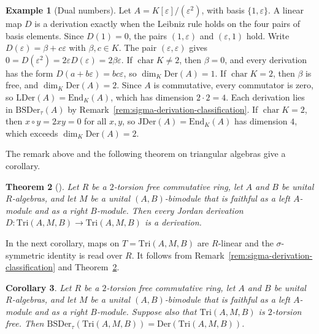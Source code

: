 \documentclass[]{interact}
\theoremstyle{plain}
\newtheorem{theorem}{Theorem}[section]
\newtheorem{corollary}[theorem]{Corollary}
\theoremstyle{definition}
\newtheorem{example}[theorem]{Example}
\theoremstyle{remark}
\newcommand{\Der}{\mathrm{Der}}
\newcommand{\JDer}{\mathrm{JDer}}
\newcommand{\BSDer}{\mathrm{BSDer}}
\newcommand{\LDer}{\mathrm{LDer}}
\begin{document}
\begin{example}[Dual numbers]\label{ex:dual-numbers}
Let $A = K[\varepsilon]/(\varepsilon^2)$, with basis $\{1, \varepsilon\}$.
A linear map $D$ is a derivation exactly when the Leibniz rule holds on the four pairs of basis elements.
Since $D(1) = 0$, the pairs $(1,\varepsilon)$ and $(\varepsilon,1)$ hold.
Write $D(\varepsilon) = \beta + c\varepsilon$ with $\beta, c \in K$.
The pair $(\varepsilon,\varepsilon)$ gives $0 = D(\varepsilon^2) = 2\varepsilon D(\varepsilon) = 2\beta\varepsilon$.
If $\operatorname{char} K \neq 2$, then $\beta = 0$, and every derivation has the form $D(a + b\varepsilon) = bc\varepsilon$, so $\dim_K \Der(A) = 1$.
If $\operatorname{char} K = 2$, then $\beta$ is free, and $\dim_K \Der(A) = 2$.
Since $A$ is commutative, every commutator is zero, so $\LDer(A) = \mathrm{End}_K(A)$, which has dimension $2 \cdot 2 = 4$.
Each derivation lies in $\BSDer_\tau(A)$ by Remark~\ref{rem:sigma-derivation-classification}.
If $\operatorname{char} K = 2$, then $x \circ y = 2xy = 0$ for all $x, y$, so $\JDer(A) = \mathrm{End}_K(A)$ has dimension $4$, which exceeds $\dim_K \Der(A) = 2$.
\end{example}

The remark above and the following theorem on triangular algebras give a corollary. %

\begin{theorem}[{\citep[Theorem 2.1]{ZhangYu2006}}]\label{thm:zhang-yu}
Let $R$ be a $2$-torsion free commutative ring, let $A$ and $B$ be unital $R$-algebras, and let $M$ be a unital $(A,B)$-bimodule that is faithful as a left $A$-module and as a right $B$-module. Then every Jordan derivation $D \colon \mathrm{Tri}(A,M,B) \to \mathrm{Tri}(A,M,B)$ is a derivation.
\end{theorem}

In the next corollary, maps on $T = \mathrm{Tri}(A,M,B)$ are $R$-linear and the $\sigma$-symmetric identity is read over $R$.
It follows from Remark~\ref{rem:sigma-derivation-classification} and Theorem~\ref{thm:zhang-yu}.

\begin{corollary}\label{cor:triangular-jordan} %
Let $R$ be a $2$-torsion free commutative ring, let $A$ and $B$ be unital $R$-algebras, and let $M$ be a unital $(A,B)$-bimodule that is faithful as a left $A$-module and as a right $B$-module.
Suppose also that $\mathrm{Tri}(A,M,B)$ is $2$-torsion free.
Then $\BSDer_\tau(\mathrm{Tri}(A,M,B)) = \Der(\mathrm{Tri}(A,M,B))$.
\end{corollary}
\end{document}
